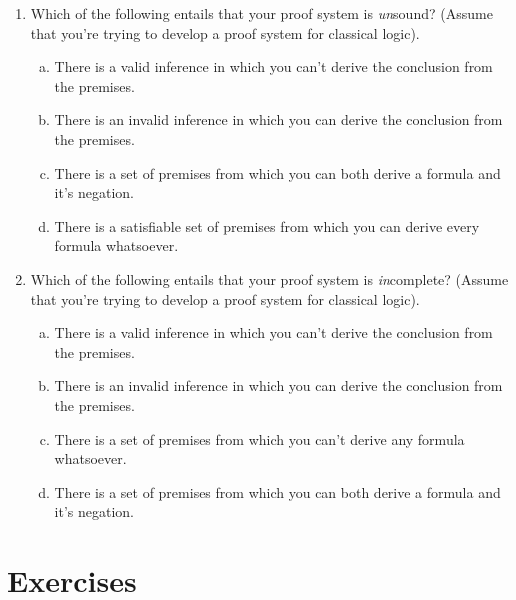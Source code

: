 	\begin{enumerate}[\thesection.1]
	
		\item Which of the following entails that your proof system is \emph{un}sound? (Assume that you're trying to develop a proof system for classical logic).
		
		\begin{enumerate}[(a)]
		
			\item There is a valid inference in which you can't derive the conclusion from the premises.
			
			\item There is an invalid inference in which you can derive the conclusion from the premises.
			
			\item There is a set of premises from which you can both derive a formula and it's negation.
			
			\item There is a satisfiable set of premises from which you can derive every formula whatsoever.
					
		\end{enumerate}
				
			\item Which of the following entails that your proof system is \emph{in}complete? (Assume that you're trying to develop a proof system for classical logic).
		
		\begin{enumerate}[(a)]
		
			\item There is a valid inference in which you can't derive the conclusion from the premises.
			
			\item There is an invalid inference in which you can derive the conclusion from the premises.
			
						\item There is a set of premises from which you can't derive any formula whatsoever.
			
			\item There is a set of premises from which you can both derive a formula and it's negation.
			
					
		\end{enumerate}		
				
	\end{enumerate}

\section{Exercises}

